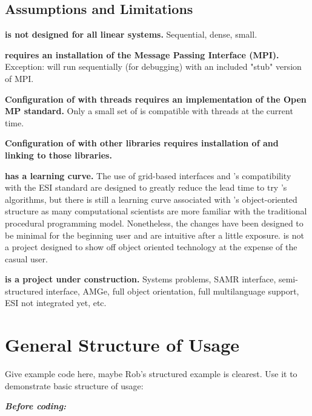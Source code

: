 \subsection{Assumptions and Limitations}

{\bf \hypre{} is not designed for all linear systems.}  Sequential, dense, small.

{\bf \hypre{} requires an installation of the Message Passing Interface (MPI).}
Exception: will run 
sequentially (for debugging) with an included "stub" version of MPI.

{\bf Configuration of \hypre{} with threads
requires an implementation of the Open MP standard.}
Only a small set of \hypre{} is compatible with threads at the current time.

{\bf Configuration of \hypre{} with other libraries requires installation of and
linking to those libraries.}

{\bf \hypre{} has a learning curve.} The use of grid-based interfaces and \hypre{}'s
compatibility with the ESI 
standard are designed to greatly reduce the lead time to try \hypre{}'s
algorithms, but there is still a learning 
curve associated with \hypre{}'s object-oriented structure as many computational
scientists are more 
familiar with the traditional procedural programming model. Nonetheless, the
changes have been designed 
to be minimal for the beginning user and are intuitive after a little exposure.
\hypre{} is not a project 
designed to show off object oriented technology at the expense of the casual
user.

{\bf \hypre{} is a project under construction.} Systems problems, SAMR interface,
semi-structured interface, 
AMGe, full object orientation, full multilanguage support, ESI not integrated
yet, etc.




\section{General Structure of Usage}

Give example code here, maybe Rob's structured example is clearest. Use it to
demonstrate basic 
structure of usage:

{\bf \it Before coding:}

